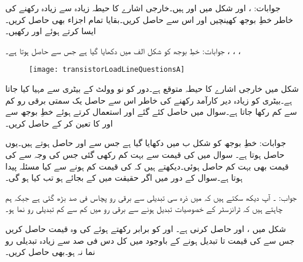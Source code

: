 جوابات: ،  اور 
شکل  میں  اور  ہیں۔خارجی اشارے کا حیطہ زیادہ سے زیادہ رکھنے کی خاطر خطِ بوجھ کھینچیں اور اس سے  حاصل کریں۔بقایا تمام اجزاء بھی حاصل کریں۔ایسا کرتے ہوئے    اور  رکھیں۔

جوابات: خطِ بوجھ  کو شکل  الف میں دکھایا گیا ہے جس سے  حاصل ہوتا ہے۔ ، ، ، 
\begin{figure}
\centering
\texttt{[image: transistorLoadLineQuestionsA]}
\caption{}
\label{شکل_سوال_ٹرانزسٹر_بار_خط_الف}
\end{figure}
شکل  میں خارجی اشارے کا حیطہ  متوقع ہے۔دور کو  نو وولٹ کے بیٹری سے  مہیا کیا جاتا ہے۔بیٹری کو زیادہ دیر کارآمد رکھنے کی خاطر اس سے حاصل یک سمتی برقی رو کم سے کم رکھا جاتا ہے۔سوال  میں حاصل کئے گئے  اور  استعمال کرتے ہوئے خطِ بوجھ  سے  اور  کا تعین کر کے  حاصل کریں۔

جوابات: خطِ بوجھ  کو شکل  ب میں دکھایا گیا ہے جس سے  اور  حاصل ہوتے ہیں۔یوں  حاصل ہوتا ہے۔
سوال  میں  کی قیمت  سے بہت کم رکھی گئی جس کی وجہ سے  کی قیمت بھی بہت کم حاصل ہوئی۔دیکھتے ہیں کہ  کی قیمت کم ہونے سے کیا مسئلہ پیدا ہوتا ہے۔سوال  کے دور میں اگر حقیقت میں  کے بجائے  ہو تب   کیا ہو گی۔

جواب: ۔ آپ دیکھ سکتے ہیں کہ  میں ذرہ سی تبدیلی سے برقی رو پچاس فی صد  بڑھ گئی ہے جبکہ ہم چاہتے ہیں کہ ٹرانزسٹر کے خصوصیات تبدیل ہونے سے برقی رو میں کم سے کم تبدیلی رو نما ہو۔

شکل  میں  ،  اور  حاصل کرنی ہے۔  اور  کو برابر رکھتے ہوئے  کی وہ قیمت حاصل کریں جس سے  کی قیمت  تا  تبدیل ہونے کے باوجود  میں کل دس فی صد سے زیادہ تبدیلی رو نما نہ ہو۔بھی حاصل کریں۔

